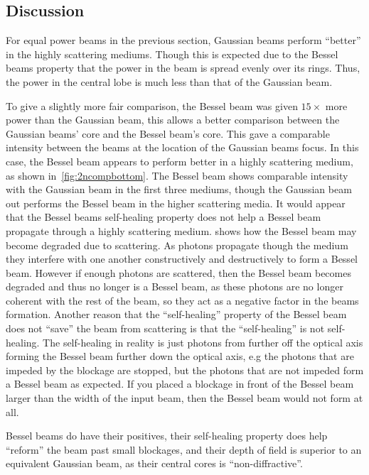 \FloatBarrier


\subsection{Discussion}

For equal power beams in the previous section, Gaussian beams perform ``better'' in the highly scattering mediums.
Though this is expected due to the Bessel beams property that the power in the beam is spread evenly over its rings.
Thus, the power in the central lobe is much less than that of the Gaussian beam.

To give a slightly more fair comparison, the Bessel beam was given $15\times$ more power than the Gaussian beam, this allows a better comparison between the Gaussian beams' core and the Bessel beam's core.
This gave a comparable intensity between the beams at the location of the Gaussian beams focus.
In this case, the Bessel beam appears to perform better in a highly scattering medium, as shown in~\cref{fig:2ncompbottom}.
The Bessel beam shows comparable intensity with the Gaussian beam in the first three mediums, though the Gaussian beam out performs the Bessel beam in the higher scattering media.
It would appear that the Bessel beams self-healing property does not help a Bessel beam propagate through a highly scattering medium.
 shows how the Bessel beam may become degraded due to scattering.
As photons propagate though the medium they interfere with one another constructively and destructively to form a Bessel beam.
However if enough photons are scattered, then the Bessel beam becomes degraded and thus no longer is a Bessel beam, as these photons are no longer coherent with the rest of the beam, so they act as a negative factor in the beams formation.
Another reason that the ``self-healing'' property of the Bessel beam does not ``save'' the beam from scattering is that the ``self-healing'' is not self-healing.
The self-healing in reality is just photons from further off the optical axis forming the Bessel beam further down the optical axis, e.g the photons that are impeded by the blockage are stopped, but the photons that are not impeded form a Bessel beam as expected.
If you placed a blockage in front of the Bessel beam larger than the width of the input beam, then the Bessel beam would not form at all.

Bessel beams do have their positives, their self-healing property does help ``reform'' the beam past small blockages, and their depth of field is superior to an equivalent Gaussian beam, as their central cores is ``non-diffractive''.


